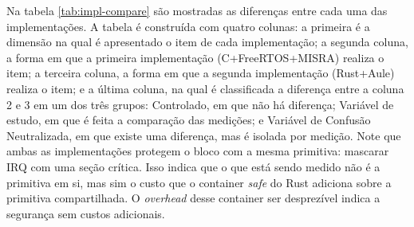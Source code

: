 Na tabela \ref{tab:impl-compare} são mostradas as diferenças entre cada uma das implementações. A tabela é construída com quatro colunas: a primeira é a dimensão na qual é apresentado o item de cada implementação; a segunda coluna, a forma em que a primeira implementação (C+\allowbreak FreeRTOS+\allowbreak \ac{MISRA}) realiza o item; a terceira coluna, a forma em que a segunda implementação (Rust+Aule) realiza o item; e a última coluna, na qual é classificada a diferença entre a coluna 2 e 3 em um dos três grupos: Controlado, em que não há diferença; Variável de estudo, em que é feita a comparação das medições; e Variável de Confusão Neutralizada, em que existe uma diferença, mas é isolada por medição. Note que ambas as implementações protegem o bloco com a mesma primitiva: mascarar \ac{IRQ} com uma seção crítica. Isso indica que o que está sendo medido não é a primitiva em si, mas sim o custo que o container \textit{safe} do Rust adiciona sobre a primitiva compartilhada. O \textit{overhead} desse container ser desprezível indica a segurança sem custos adicionais.

